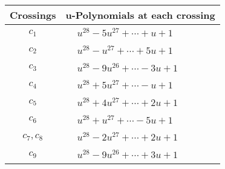 \documentclass[1p]{elsarticle_modified}
\theoremstyle{definition}
\begin{document}
\begin{tabular}{m{50pt}|m{274pt}}
Crossings & \hspace{64pt}u-Polynomials at each crossing \\
\hline $$\begin{aligned}c_{1}\end{aligned}$$&$\begin{aligned}
&u^{28}-5 u^{27}+\cdots+u+1
\end{aligned}$\\
\hline $$\begin{aligned}c_{2}\end{aligned}$$&$\begin{aligned}
&u^{28}- u^{27}+\cdots+5 u+1
\end{aligned}$\\
\hline $$\begin{aligned}c_{3}\end{aligned}$$&$\begin{aligned}
&u^{28}-9 u^{26}+\cdots-3 u+1
\end{aligned}$\\
\hline $$\begin{aligned}c_{4}\end{aligned}$$&$\begin{aligned}
&u^{28}+5 u^{27}+\cdots- u+1
\end{aligned}$\\
\hline $$\begin{aligned}c_{5}\end{aligned}$$&$\begin{aligned}
&u^{28}+4 u^{27}+\cdots+2 u+1
\end{aligned}$\\
\hline $$\begin{aligned}c_{6}\end{aligned}$$&$\begin{aligned}
&u^{28}+u^{27}+\cdots-5 u+1
\end{aligned}$\\
\hline $$\begin{aligned}c_{7},c_{8}\end{aligned}$$&$\begin{aligned}
&u^{28}-2 u^{27}+\cdots+2 u+1
\end{aligned}$\\
\hline $$\begin{aligned}c_{9}\end{aligned}$$&$\begin{aligned}
&u^{28}-9 u^{26}+\cdots+3 u+1
\end{aligned}$\\

\end{tabular}
\end{document}
